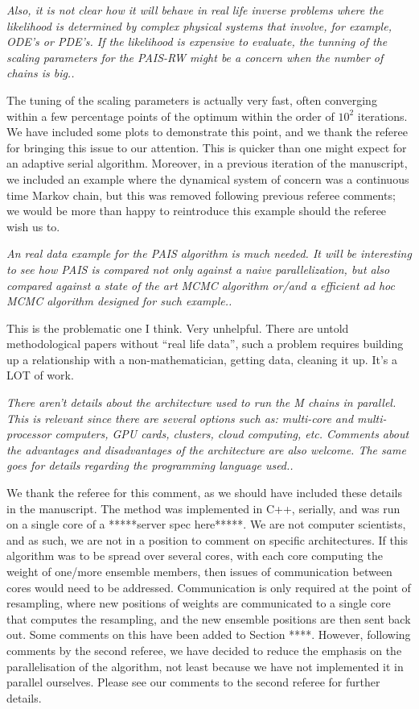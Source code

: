 \documentclass{article}
\newcommand{\comment}[2]{\vspace{0.6cm}{\bf Comment:} {\it #1.}

\vspace{0.3cm}{\bf Answer:} #2}
\begin{document}
\comment{Also, it is not clear how it will behave in real life inverse 
problems where the likelihood is determined by complex physical systems that 
involve, for example, ODE's or PDE's. If the likelihood is expensive to 
evaluate, the tunning of the scaling parameters for the PAIS-RW might be a 
concern when the number of chains is big.}{The tuning of the scaling parameters is actually very fast, often converging within a few percentage points of the optimum within the order of $10^2$ iterations. We have included some plots to demonstrate this point, and we thank the referee for bringing this issue to our attention. This is quicker than one might expect for an adaptive serial algorithm. Moreover, in a previous iteration of the manuscript, we included an example where the dynamical system of concern was a continuous time Markov chain, but this was removed following previous referee comments; we would be more than happy to reintroduce this example should the referee wish us to.}

\comment{An real data example for the PAIS algorithm is much needed. It will be 
interesting to see how PAIS is compared not only against a naive 
parallelization, but also compared against a state of the art MCMC algorithm 
or/and a efficient ad hoc MCMC algorithm designed for such example.}{This is the problematic one I think. Very unhelpful. There are untold methodological papers without ``real life data'', such a problem requires building up a relationship with a non-mathematician, getting data, cleaning it up. It's a LOT of work.}

\comment{There aren't details about the architecture used to run the M chains in 
parallel. This is relevant since there are several options such as: multi-core 
and multi-processor computers, GPU cards, clusters, cloud computing, etc. 
Comments about the advantages and disadvantages of the architecture 
are also welcome. The same goes for details regarding the programming language 
used.}{We thank the referee for this comment, as we should have included these details in the manuscript. The method was implemented in C++, serially, and was run on a single core of a *****server spec here*****. We are not computer scientists, and as such, we are not in a position to comment on specific architectures. If this algorithm was to be spread over several cores, with each core computing the weight of one/more ensemble members, then issues of communication between cores would need to be addressed. Communication is only required at the point of resampling, where new positions of weights are communicated to a single core that computes the resampling, and the new ensemble positions are then sent back out. Some comments on this have been added to Section ****. However, following comments by the second referee, we have decided to reduce the emphasis on the parallelisation of the algorithm, not least because we have not implemented it in parallel ourselves. Please see our comments to the second referee for further details.}
\end{document}
